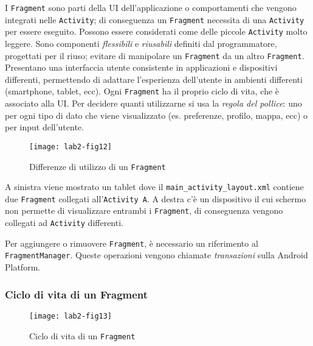 I \texttt{Fragment} sono parti della UI dell'applicazione o comportamenti che vengono integrati nelle \texttt{Activity}; di conseguenza un \texttt{Fragment} necessita di una \texttt{Activity} per essere eseguito. Possono essere considerati come delle piccole \texttt{Activity} molto leggere.
Sono componenti \textit{flessibili} e \textit{riusabili} definiti dal programmatore, progettati per il riuso; evitare di manipolare un \texttt{Fragment} da un altro \texttt{Fragment}. Presentano una interfaccia utente consistente in applicazioni e dispositivi differenti, permettendo di adattare l'esperienza dell'utente in ambienti differenti (smartphone, tablet, ecc).
Ogni \texttt{Fragment} ha il proprio ciclo di vita, che è associato alla UI. Per decidere quanti utilizzarne si usa la \textit{regola del pollice}: uno per ogni tipo di dato che viene visualizzato (es. preferenze, profilo, mappa, ecc) o per input dell'utente.

\begin{figure}[htbp]
	\centering
	\texttt{[image: lab2-fig12]}
	\caption[Fragment Tablet Smartphone]{Differenze di utilizzo di un \texttt{Fragment}}\label{img:lab2-fig12}
\end{figure}

A sinistra viene mostrato un tablet dove il \texttt{main\_activity\_layout.xml} contiene due \texttt{Fragment} collegati all'\texttt{Activity A}. A destra c'è un dispositivo il cui schermo non permette di visualizzare entrambi i \texttt{Fragment}, di conseguenza vengono collegati ad \texttt{Activity} differenti.

Per aggiungere o rimuovere \texttt{Fragment}, è necessario un riferimento al \texttt{FragmentManager}. Queste operazioni vengono chiamate \textit{transazioni} sulla Android Platform.

\subsubsection{Ciclo di vita di un Fragment}

\begin{figure}[htbp]
	\centering
	\texttt{[image: lab2-fig13]}
	\caption[Ciclo di vita Fragment]{Ciclo di vita di un \texttt{Fragment}}\label{img:lab2-fig13}
\end{figure}

